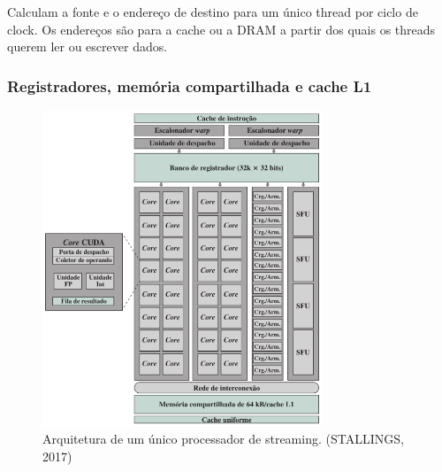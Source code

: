 Calculam a fonte e o endereço de destino para um único thread por ciclo de clock. Os endereços são para a cache ou a DRAM a partir dos quais os threads querem ler ou escrever dados.

\subsubsection{Registradores, memória compartilhada e cache L1}



\begin{figure}
\centering
\includegraphics[width=8.4cm]{arquitetura_MS.png} 
\caption{Arquitetura de um único processador de streaming. (STALLINGS, 2017)} 
\label{arq:fermi:2}
\end{figure}